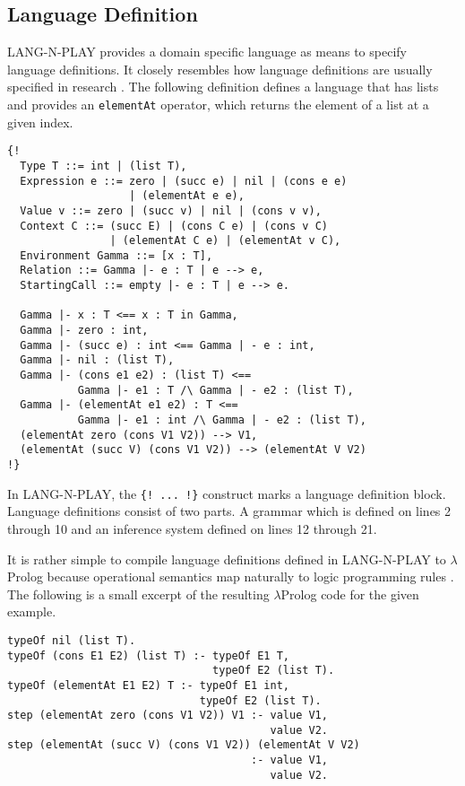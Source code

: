 \subsection{Language Definition}
LANG-N-PLAY provides a domain specific language as means to specify language definitions. It closely resembles how language definitions are usually specified in research \cite{cimini_effectiveness_2020}. The following definition defines a language that has lists and provides an \lstinline{elementAt} operator, which returns the element of a list at a given index.

\begin{verbatim}
{!
  Type T ::= int | (list T),
  Expression e ::= zero | (succ e) | nil | (cons e e)
                   | (elementAt e e),
  Value v ::= zero | (succ v) | nil | (cons v v),
  Context C ::= (succ E) | (cons C e) | (cons v C)
                | (elementAt C e) | (elementAt v C),
  Environment Gamma ::= [x : T],
  Relation ::= Gamma |- e : T | e --> e,
  StartingCall ::= empty |- e : T | e --> e.

  Gamma |- x : T <== x : T in Gamma,
  Gamma |- zero : int,
  Gamma |- (succ e) : int <== Gamma | - e : int,
  Gamma |- nil : (list T),
  Gamma |- (cons e1 e2) : (list T) <==
           Gamma |- e1 : T /\ Gamma | - e2 : (list T),
  Gamma |- (elementAt e1 e2) : T <==
           Gamma |- e1 : int /\ Gamma | - e2 : (list T),
  (elementAt zero (cons V1 V2)) --> V1,
  (elementAt (succ V) (cons V1 V2)) --> (elementAt V V2)
!}
\end{verbatim}

In LANG-N-PLAY, the \lstinline|{! ... !}| construct marks a language definition block. Language definitions consist of two parts. A grammar which is defined on lines 2 through 10 and an inference system defined on lines 12 through 21.

It is rather simple to compile language definitions defined in LANG-N-PLAY to $\lambda$Prolog because operational semantics map naturally to logic programming rules \cite{cimini_effectiveness_2020}. The following is a small excerpt of the resulting $\lambda$Prolog code for the given example.

\begin{verbatim}
typeOf nil (list T).
typeOf (cons E1 E2) (list T) :- typeOf E1 T,
                                typeOf E2 (list T).
typeOf (elementAt E1 E2) T :- typeOf E1 int,
                              typeOf E2 (list T).
step (elementAt zero (cons V1 V2)) V1 :- value V1, 
                                         value V2.
step (elementAt (succ V) (cons V1 V2)) (elementAt V V2)
                                      :- value V1, 
                                         value V2.
\end{verbatim}

